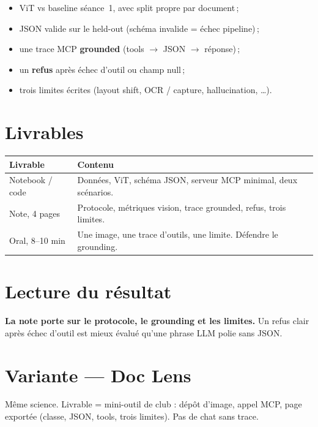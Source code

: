 \documentclass[11pt,a4paper]{article}
\begin{document}
\begin{itemize}
  \item ViT vs baseline séance~1, avec split propre par document\,;
  \item JSON valide sur le held-out (schéma invalide = échec pipeline)\,;
  \item une trace MCP \textbf{grounded} (tools $\rightarrow$ JSON $\rightarrow$ réponse)\,;
  \item un \textbf{refus} après échec d'outil ou champ null\,;
  \item trois limites écrites (layout shift, OCR / capture, hallucination, \ldots).
\end{itemize}

\section{Livrables}

\begin{center}
\renewcommand{\arraystretch}{1.25}
\begin{tabular}{@{}p{3.2cm}p{11.4cm}@{}}
\toprule
\textbf{Livrable} & \textbf{Contenu} \\
\midrule
Notebook / code & Données, ViT, schéma JSON, serveur MCP minimal, deux scénarios. \\
Note, 4 pages & Protocole, métriques vision, trace grounded, refus, trois limites. \\
Oral, 8--10 min & Une image, une trace d'outils, une limite. Défendre le grounding. \\
\bottomrule
\end{tabular}
\end{center}

\section{Lecture du résultat}

{\color{warn}\textbf{La note porte sur le protocole, le grounding et les limites.}}
Un refus clair après échec d'outil est mieux évalué qu'une phrase LLM polie
sans JSON.

\section{Variante --- Doc Lens}

Même science. Livrable = mini-outil de club : dépôt d'image, appel MCP,
page exportée (classe, JSON, tools, trois limites). Pas de chat sans trace.
\end{document}

